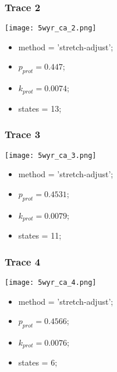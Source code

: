 \subsubsection{Trace 2}
\begin{minipage}[c]{0.7\textwidth}
    \texttt{[image: 5wyr\_ca\_2.png]}
\end{minipage}
\hfill
\begin{minipage}[c]{0.45\textwidth}
    \begin{itemize}
        \item method = 'stretch-adjust';
        \item $p_{prot}=0.447$;
        \item $k_{prot}=0.0074$;
        \item states = 13;
    \end{itemize}
\end{minipage}

\subsubsection{Trace 3}
\begin{minipage}[c]{0.7\textwidth}
    \texttt{[image: 5wyr\_ca\_3.png]}
\end{minipage}
\hfill
\begin{minipage}[c]{0.45\textwidth}
    \begin{itemize}
        \item method = 'stretch-adjust';
        \item $p_{prot}=0.4531$;
        \item $k_{prot}=0.0079$;
        \item states = 11;
    \end{itemize}
\end{minipage}

\subsubsection{Trace 4}
\begin{minipage}[c]{0.7\textwidth}
    \texttt{[image: 5wyr\_ca\_4.png]}
\end{minipage}
\hfill
\begin{minipage}[c]{0.45\textwidth}
    \begin{itemize}
        \item method = 'stretch-adjust';
        \item $p_{prot}=0.4566$;
        \item $k_{prot}=0.0076$;
        \item states = 6;
    \end{itemize}
\end{minipage}

